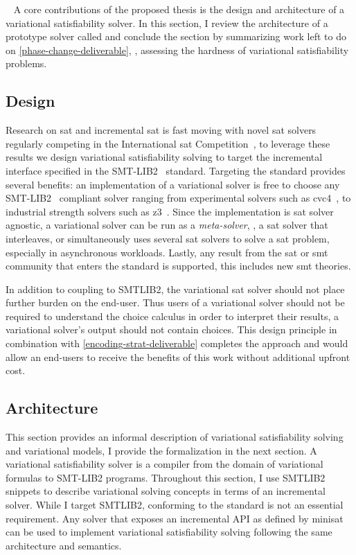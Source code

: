 ~\label{sec:vsat} A core contributions of the proposed thesis is the design and
architecture of a variational satisfiability solver. In this section, I review
the architecture of a prototype solver called \vsat{} and conclude the section
by summarizing work left to do on \autoref{phase-change-deliverable}, \ie{},
assessing the hardness of variational satisfiability problems.

\subsection{Design}
Research on \ac{sat} and incremental \ac{sat} is fast moving with novel \ac{sat}
solvers regularly competing in the International \ac{sat}
Competition~\cite{interSatComp}, to leverage these results we design variational
satisfiability solving to target the incremental interface specified in the
SMT-LIB2~\cite{BarFT-RR-17} standard. Targeting the standard provides several
benefits: an implementation of a variational solver is free to choose any
SMT-LIB2~\cite{BarFT-RR-17} compliant solver ranging from experimental solvers
such as cvc4~\cite{10.1007/978-3-642-22110-1_14}, to industrial strength solvers
such as z3~\cite{10.1007/978-3-540-78800-3_24}. Since the implementation is
\ac{sat} solver agnostic, a variational solver can be run as a
\emph{meta-solver}, \ie{}, a \ac{sat} solver that interleaves, or simultaneously
uses several \ac{sat} solvers to solve a \ac{sat} problem, especially in
asynchronous workloads. Lastly, any result from the \ac{sat} or \ac{smt}
community that enters the standard is supported, this includes new \ac{smt}
theories.

In addition to coupling to SMTLIB2, the variational \ac{sat} solver should not
place further burden on the end-user. Thus users of a variational solver should
not be required to understand the choice calculus in order to interpret their
results, a variational solver's output should not contain choices. This design
principle in combination with \autoref{encoding-strat-deliverable} completes the
approach and would allow an end-users to receive the benefits of this work
without additional upfront cost.

\subsection{Architecture}

This section provides an informal description of variational satisfiability
solving and variational models, I provide the formalization in the next section.
A variational satisfiability solver is a compiler from the domain of variational
formulas to SMT-LIB2 programs. Throughout this section, I use SMTLIB2 snippets
to describe variational solving concepts in terms of an incremental solver.
While I target SMTLIB2, conforming to the standard is not an essential
requirement. Any solver that exposes an incremental API as defined by
minisat~\cite{10.1007/978-3-319-09284-3_16} can be used to implement variational
satisfiability solving following the same architecture and semantics.

